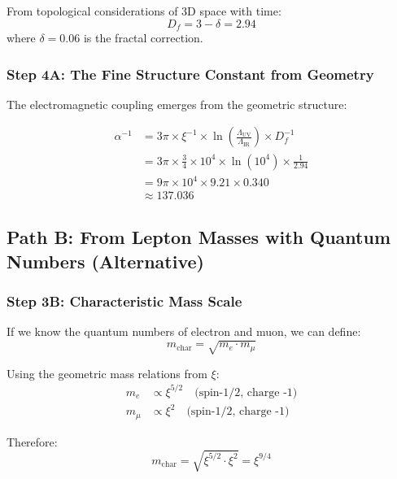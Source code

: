 \documentclass[12pt,a4paper]{article}
\newcommand{\xipar}{\xi}  %
\begin{document}
	From topological considerations of 3D space with time:
	\begin{equation}
		D_f = 3 - \delta = 2.94
	\end{equation}
	where $\delta = 0.06$ is the fractal correction.
	
	\subsubsection{Step 4A: The Fine Structure Constant from Geometry}
	
	The electromagnetic coupling emerges from the geometric structure:
	
	\begin{keyresult}
		\begin{align}
			\alpha^{-1} &= 3\pi \times \xipar^{-1} \times \ln\left(\frac{\Lambda_{\text{UV}}}{\Lambda_{\text{IR}}}\right) \times D_f^{-1} \\
			&= 3\pi \times \frac{3}{4} \times 10^{4} \times \ln(10^{4}) \times \frac{1}{2.94} \\
			&= 9\pi \times 10^{4} \times 9.21 \times 0.340 \\
			&\approx 137.036
		\end{align}
	\end{keyresult}
	
	\subsection{Path B: From Lepton Masses with Quantum Numbers (Alternative)}
	
	\subsubsection{Step 3B: Characteristic Mass Scale}
	
	If we know the quantum numbers of electron and muon, we can define:
	\begin{equation}
		m_{\text{char}} = \sqrt{m_e \cdot m_\mu}
	\end{equation}
	
	Using the geometric mass relations from $\xipar$:
	\begin{align}
		m_e &\propto \xipar^{5/2} \quad \text{(spin-1/2, charge -1)} \\
		m_\mu &\propto \xipar^{2} \quad \text{(spin-1/2, charge -1)}
	\end{align}
	
	Therefore:
	\begin{equation}
		m_{\text{char}} = \sqrt{\xipar^{5/2} \cdot \xipar^{2}} = \xipar^{9/4}
	\end{equation}
	
\end{document}
